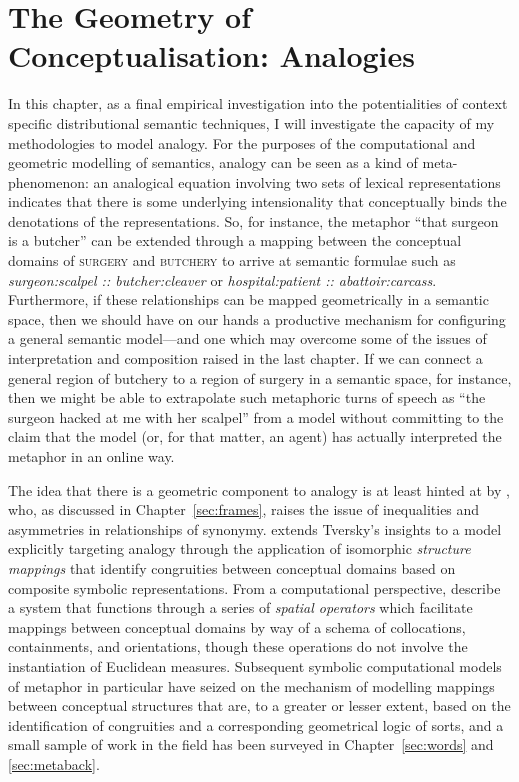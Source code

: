 \chapter{The Geometry of Conceptualisation: Analogies} \label{chap:analogy}
In this chapter, as a final empirical investigation into the potentialities of context specific distributional semantic techniques, I will investigate the capacity of my methodologies to model analogy.  For the purposes of the computational and geometric modelling of semantics, analogy can be seen as a kind of meta-phenomenon: an analogical equation involving two sets of lexical representations indicates that there is some underlying intensionality that conceptually binds the denotations of the representations.  So, for instance, the metaphor ``that surgeon is a butcher'' can be extended through a mapping between the conceptual domains of \textsc{surgery} and \textsc{butchery} to arrive at semantic formulae such as \emph{surgeon:scalpel :: butcher:cleaver} or \emph{hospital:patient :: abattoir:carcass}.  Furthermore, if these relationships can be mapped geometrically in a semantic space, then we should have on our hands a productive mechanism for configuring a general semantic model---and one which may overcome some of the issues of interpretation and composition raised in the last chapter.  If we can connect a general region of butchery to a region of surgery in a semantic space, for instance, then we might be able to extrapolate such metaphoric turns of speech as ``the surgeon hacked at me with her scalpel'' from a model without committing to the claim that the model (or, for that matter, an agent) has actually interpreted the metaphor in an online way.

The idea that there is a geometric component to analogy is at least hinted at by \cite{Tversky1977}, who, as discussed in Chapter~\ref{sec:frames}, raises the issue of inequalities and asymmetries in relationships of synonymy.  \cite{Gentner1983} extends Tversky's insights to a model explicitly targeting analogy through the application of isomorphic \emph{structure mappings} that identify congruities between conceptual domains based on composite symbolic representations.  From a computational perspective, \cite{VealeEA1992} describe a system that functions through a series of \emph{spatial operators} which facilitate mappings between conceptual domains by way of a schema of collocations, containments, and orientations, though these operations do not involve the instantiation of Euclidean measures.  Subsequent symbolic computational models of metaphor in particular have seized on the mechanism of modelling mappings between conceptual structures that are, to a greater or lesser extent, based on the identification of congruities and a corresponding geometrical logic of sorts, and a small sample of work in the field has been surveyed in Chapter~\ref{sec:words} and \ref{sec:metaback}.

